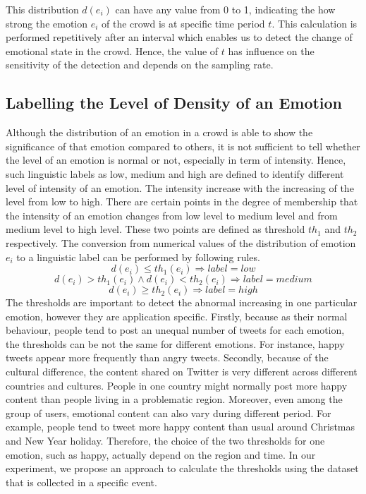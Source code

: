 This distribution \(d(e_i)\) can have any value from 0 to 1, indicating the how strong the emotion \(e_i\) of the crowd is at specific time period \(t\). This calculation is performed repetitively after an interval which enables us to detect the change of emotional state in the crowd. Hence, the value of \(t\) has influence on the sensitivity of the detection and depends on the sampling rate.

\subsection{Labelling the Level of Density of an Emotion}
Although the distribution of an emotion in a crowd is able to show the significance of that emotion compared to others, it is not sufficient to tell whether the level of an emotion is normal or not, especially in term of intensity. Hence, such linguistic labels as low, medium and high are defined to identify different level of intensity of an emotion. The intensity increase with the increasing of the level from low to high. There are certain points in the degree of membership that the intensity of an emotion changes from low level to medium level and from medium level to high level. These two points are defined as threshold \(th_1\) and \(th_2\) respectively. The conversion from numerical values of the distribution of emotion \(e_i\) to a linguistic label can be performed by following rules.
\[
d(e_i) \leq th_1(e_i) \Rightarrow label = low
\]
\[
d(e_i) > th_1(e_i) \land d(e_i) < th_2(e_i) \Rightarrow label = medium
\]
\[
d(e_i) \geq th_2(e_i) \Rightarrow label = high
\]
The thresholds are important to detect the abnormal increasing in one particular emotion, however they are application specific. Firstly, because as their normal behaviour, people tend to post an unequal number of tweets for each emotion, the thresholds can be not the same for different emotions. For instance, happy tweets appear more frequently than angry tweets. Secondly, because of the cultural difference, the content shared on Twitter is very different across different countries and cultures. People in one country might normally post more happy content than people living in a problematic region. Moreover, even among the group of users, emotional content can also vary during different period. For example, people tend to tweet more happy content than usual around Christmas and New Year holiday. Therefore, the choice of the two thresholds for one emotion, such as happy, actually depend on the region and time. In our experiment, we propose an approach to calculate the thresholds using the dataset that is collected in a specific event.

